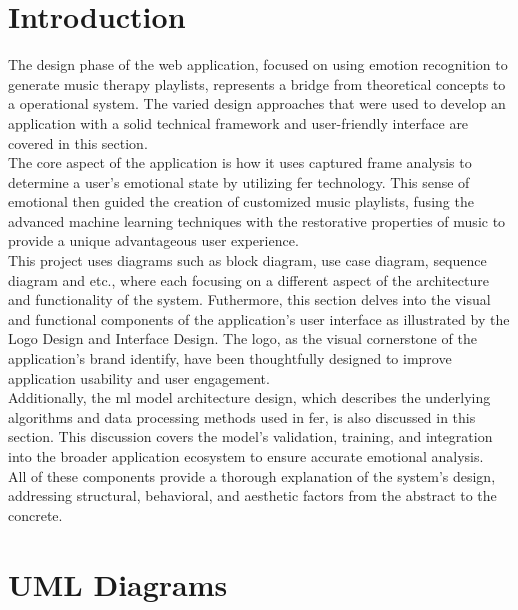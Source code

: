\section{Introduction}
The design phase of the web application, focused on using emotion recognition to generate music therapy playlists, represents a bridge from theoretical concepts to a operational system.
The varied design approaches that were used to develop an application with a solid technical framework and user-friendly interface are covered in this section.
\\
\indent The core aspect of the application is how it uses captured frame analysis to determine a user's emotional state by utilizing \gls{fer} technology.
This sense of emotional then guided the creation of customized music playlists, fusing the advanced machine learning techniques with the restorative properties of music to provide a unique advantageous user experience.
\\
\indent This project uses diagrams such as block diagram, use case diagram, sequence diagram and etc., where each focusing on a different aspect of the architecture and functionality of the system.
Futhermore, this section delves into the visual and functional components of the application's user interface as illustrated by the Logo Design and Interface Design.
The logo, as the visual cornerstone of the application's brand identify, have been thoughtfully designed to improve application usability and user engagement.
\\
\indent Additionally, the \gls{ml} model architecture design, which describes the underlying algorithms and data processing methods used in \gls{fer}, is also discussed in this section.
This discussion covers the model's validation, training, and integration into the broader application ecosystem to ensure accurate emotional analysis.
\\
\indent All of these components provide a thorough explanation of the system's design, addressing structural, behavioral, and aesthetic factors from the abstract to the concrete.

\section{UML Diagrams}
